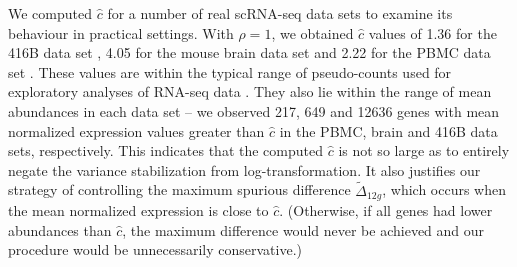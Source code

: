 \documentclass[10pt,letterpaper]{article}
\begin{document}
We computed $\hat c$ for a number of real scRNA-seq data sets to examine its behaviour in practical settings. 
With $\rho=1$, we obtained $\hat c$ values of 1.36 for the 416B data set \cite{lun2017assessing}, 4.05 for the mouse brain data set \cite{zeisel2015brain} and 2.22 for the PBMC data set \cite{zheng2017massively}.
These values are within the typical range of pseudo-counts used for exploratory analyses of RNA-seq data \cite{chen2016reads}.
They also lie within the range of mean abundances in each data set -- we observed 217, 649 and 12636 genes with mean normalized expression values greater than $\hat c$ in the PBMC, brain and 416B data sets, respectively.
This indicates that the computed $\hat c$ is not so large as to entirely negate the variance stabilization from log-transformation.
It also justifies our strategy of controlling the maximum spurious difference $\tilde \Delta_{12g}$, which occurs when the mean normalized expression is close to $\hat c$.
(Otherwise, if all genes had lower abundances than $\hat c$, the maximum difference would never be achieved and our procedure would be unnecessarily conservative.)

\end{document}

